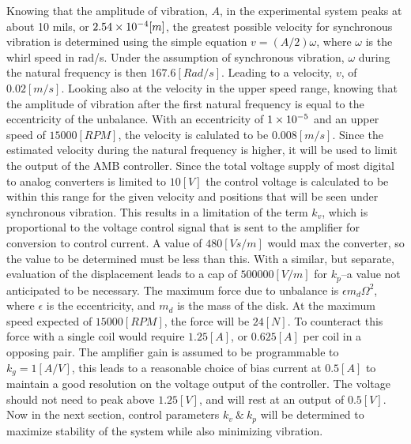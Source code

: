Knowing that the amplitude of vibration, $ A $, in the experimental system peaks at about 10 mils, or $ 2.54\times 10^{-4}[m] $, the greatest possible velocity for synchronous vibration is determined using the simple equation $ v=(A/2)\omega $, where $ \omega $ is the whirl speed in rad/s. Under the assumption of synchronous vibration, $ \omega $ during the natural frequency is then $ 167.6[Rad/s] $. Leading to a velocity, $ v $, of $ 0.02[m/s] $. Looking also at the velocity in the upper speed range, knowing that the amplitude of vibration after the first natural frequency is equal to the eccentricity of the unbalance. With an eccentricity of $ 1\times 10^{-5} $ and an upper speed of $ 15000[RPM] $, the velocity is calulated to be $ 0.008[m/s] $. Since the estimated velocity during the natural frequency is higher, it will be used to limit the output of the AMB controller. Since the total voltage supply of most digital to analog converters is limited to $ 10[V] $ the control voltage is calculated to be within this range for the given velocity and positions that will be seen under synchronous vibration. This results in a limitation of the term $ k_v $, which is proportional to the voltage control signal that is sent to the amplifier for conversion to control current. A value of $ 480[Vs/m] $ would max the converter, so the value to be determined must be less than this. With a similar, but separate, evaluation of the displacement leads to a cap of $ 500000[V/m] $ for $ k_p $--a value not anticipated to be necessary. The maximum force due to unbalance is $ \epsilon m_d\Omega^2 $, where $ \epsilon $ is the eccentricity, and $ m_d $ is the mass of the disk. At the maximum speed expected of $ 15000[RPM] $, the force will be $ 24[N] $. To counteract this force with a single coil would require $ 1.25[A] $, or $ 0.625[A] $ per coil in a opposing pair. The amplifier gain is assumed to be programmable to $ k_g=1[A/V] $, this leads to a reasonable choice of bias current at $ 0.5[A] $ to maintain a good resolution on the voltage output of the controller. The voltage should not need to peak above $ 1.25[V] $, and will rest at an output of $ 0.5[V] $. Now in the next section, control parameters $ k_v\ \&\ k_p $ will be determined to maximize stability of the system while also minimizing vibration.
